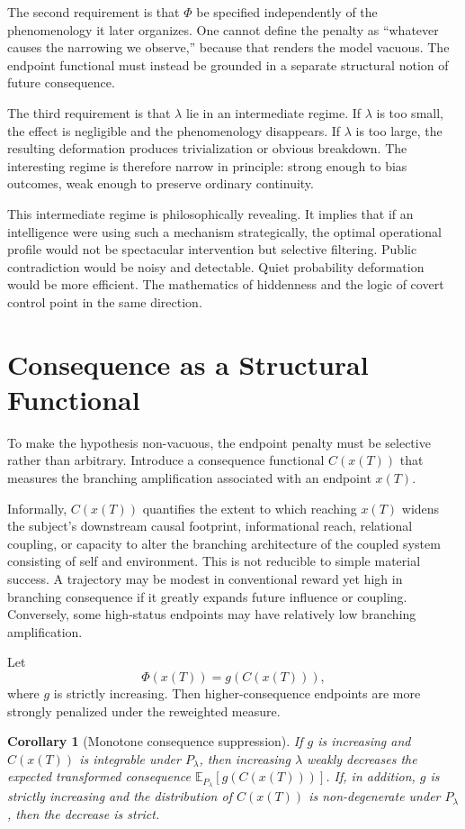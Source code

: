 \documentclass[12pt]{article}
\newtheorem{corollary}{Corollary}
\begin{document}
The second requirement is that $\Phi$ be specified independently of the phenomenology it later organizes. One cannot define the penalty as ``whatever causes the narrowing we observe,'' because that renders the model vacuous. The endpoint functional must instead be grounded in a separate structural notion of future consequence.

The third requirement is that $\lambda$ lie in an intermediate regime. If $\lambda$ is too small, the effect is negligible and the phenomenology disappears. If $\lambda$ is too large, the resulting deformation produces trivialization or obvious breakdown. The interesting regime is therefore narrow in principle: strong enough to bias outcomes, weak enough to preserve ordinary continuity.

This intermediate regime is philosophically revealing. It implies that if an intelligence were using such a mechanism strategically, the optimal operational profile would not be spectacular intervention but selective filtering. Public contradiction would be noisy and detectable. Quiet probability deformation would be more efficient. The mathematics of hiddenness and the logic of covert control point in the same direction.

\section{Consequence as a Structural Functional}

To make the hypothesis non-vacuous, the endpoint penalty must be selective rather than arbitrary. Introduce a consequence functional $C(x(T))$ that measures the branching amplification associated with an endpoint $x(T)$.

Informally, $C(x(T))$ quantifies the extent to which reaching $x(T)$ widens the subject's downstream causal footprint, informational reach, relational coupling, or capacity to alter the branching architecture of the coupled system consisting of self and environment. This is not reducible to simple material success. A trajectory may be modest in conventional reward yet high in branching consequence if it greatly expands future influence or coupling. Conversely, some high-status endpoints may have relatively low branching amplification.

Let
\[
\Phi(x(T)) = g(C(x(T))),
\]
where $g$ is strictly increasing. Then higher-consequence endpoints are more strongly penalized under the reweighted measure.

\begin{corollary}[Monotone consequence suppression]
If $g$ is increasing and $C(x(T))$ is integrable under $P_\lambda$, then increasing $\lambda$ weakly decreases the expected transformed consequence $\mathbb{E}_{P_\lambda}[g(C(x(T)))]$. If, in addition, $g$ is strictly increasing and the distribution of $C(x(T))$ is non-degenerate under $P_\lambda$, then the decrease is strict.
\end{corollary}
\end{document}
